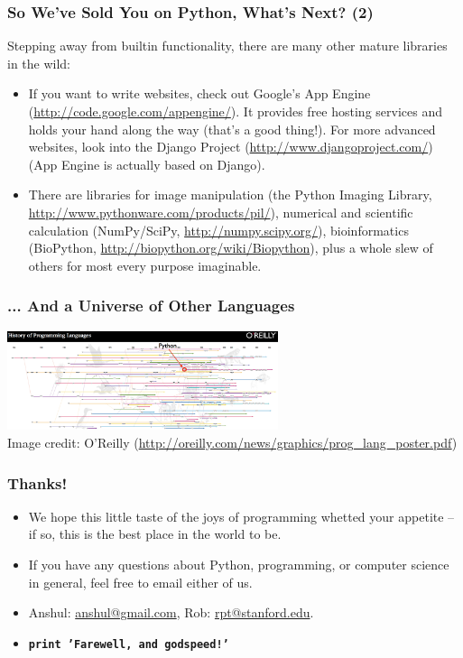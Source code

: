 \documentclass[10pt]{beamer}
\begin{document}
\begin{frame}
  \frametitle{So We've Sold You on Python, What's Next? (2)}
  Stepping away from builtin functionality, there are many other mature libraries in the wild:
  \begin{itemize}
    \item If you want to write websites, check out Google's App Engine (\href{http://code.google.com/appengine/}{http://code.google.com/appengine/}).  It provides free hosting services and holds your hand along the way (that's a good thing!).  For more advanced websites, look into the Django Project (\href{http://www.djangoproject.com/}{http://www.djangoproject.com/}) (App Engine is actually based on Django). 
    \item There are libraries for image manipulation (the Python Imaging Library, \href{http://www.pythonware.com/products/pil}{http://www.pythonware.com/products/pil/}), numerical and scientific calculation (NumPy/SciPy, \href{http://numpy.scipy.org/}{http://numpy.scipy.org/}), bioinformatics (BioPython, \href{http://biopython.org/wiki/Biopython}{http://biopython.org/wiki/Biopython}), plus a whole slew of others for most every purpose imaginable.
  \end{itemize}
\end{frame}

\begin{frame}
  \frametitle{... And a Universe of Other Languages}
  \begin{center}
    \includegraphics[width=300px]{ProgrammingLanguagesPoster-AnnotatedCropped.png} \\
    \tiny 
    Image credit: O'Reilly (\href{http://oreilly.com/news/graphics/prog\_lang\_poster.pdf}{http://oreilly.com/news/graphics/prog\_lang\_poster.pdf})
  \end{center}
\end{frame}

\begin{frame}
  \frametitle{Thanks!}
  \begin{itemize}
    \item We hope this little taste of the joys of programming whetted your appetite -- if so, this is the best place in the world to be.
    \item If you have any questions about Python, programming, or computer science in general, feel free to email either of us.
    \item Anshul: \href{mailto:nigham@gmail.com}{anshul@gmail.com}, Rob: \href{mailto:rpt@stanford.edu}{rpt@stanford.edu}.
    \item \texttt{\textbf{print 'Farewell, and godspeed!'}}
  \end{itemize}
\end{frame}
\end{document}
